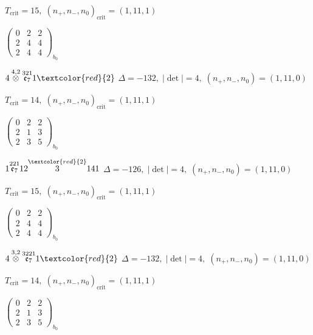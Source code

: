 \documentclass[10pt]{article}
\begin{document}
\hspace{1em}$T_{\text{crit}}=15,\; (n_+,n_-,n_0)_{\text{crit}}=(1,11,1)$

\hspace{2em}$\left(\begin{smallmatrix}0 & 2 & 2 \\ 2 & 4 & 4 \\ 2 & 4 & 4\end{smallmatrix}\right)_{\!b_0}$

\smallskip

$4\overset{4,2}{\otimes}\overset{321}{\mathfrak{e}_7}1\textcolor{red}{2}$ \quad $\Delta=-132,\; |\det|=4,\; (n_+,n_-,n_0)=(1,11,0)$

\hspace{1em}$T_{\text{crit}}=14,\; (n_+,n_-,n_0)_{\text{crit}}=(1,11,1)$

\hspace{2em}$\left(\begin{smallmatrix}0 & 2 & 2 \\ 2 & 1 & 3 \\ 2 & 3 & 5\end{smallmatrix}\right)_{\!b_0}$

\smallskip

$1\overset{221}{\mathfrak{e}_7}12\overset{\textcolor{red}{2}}{3}141$ \quad $\Delta=-126,\; |\det|=4,\; (n_+,n_-,n_0)=(1,11,0)$

\hspace{1em}$T_{\text{crit}}=15,\; (n_+,n_-,n_0)_{\text{crit}}=(1,11,1)$

\hspace{2em}$\left(\begin{smallmatrix}0 & 2 & 2 \\ 2 & 4 & 4 \\ 2 & 4 & 4\end{smallmatrix}\right)_{\!b_0}$

\smallskip

$4\overset{3,2}{\otimes}\overset{3221}{\mathfrak{e}_7}1\textcolor{red}{2}$ \quad $\Delta=-132,\; |\det|=4,\; (n_+,n_-,n_0)=(1,11,0)$

\hspace{1em}$T_{\text{crit}}=14,\; (n_+,n_-,n_0)_{\text{crit}}=(1,11,1)$

\hspace{2em}$\left(\begin{smallmatrix}0 & 2 & 2 \\ 2 & 1 & 3 \\ 2 & 3 & 5\end{smallmatrix}\right)_{\!b_0}$
\end{document}
